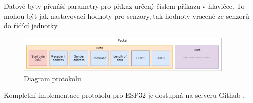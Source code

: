 Datové byty přenáší parametry pro příkaz určený číslem příkazu v hlavičce.
To mohou být jak nastavovací hodnoty pro senzory, tak hodnoty vracené ze senzorů do řídící jednotky.

\begin{figure}[h]
    \begin{small}
        \begin{center}
            \includegraphics[width=400px]{img/Protocol_diagram.png}
        \end{center}
        \caption{Diagram protokolu}
        \label{fig: Diagram protokolu}
    \end{small}
\end{figure}


Kompletní implementace protokolu pro ESP32 je dostupná na serveru Github \cite{protocol}. 


